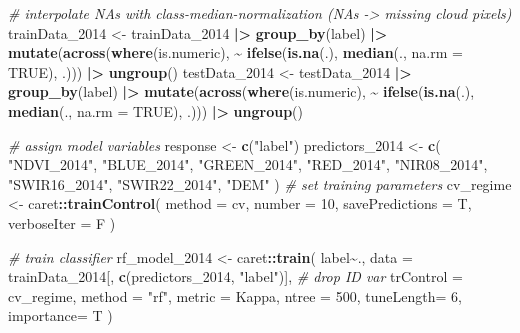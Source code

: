 \documentclass[
]{article}
\newenvironment{Shaded}{\begin{snugshade}}{\end{snugshade}}
\newcommand{\AttributeTok}[1]{\textcolor[rgb]{0.13,0.29,0.53}{#1}}
\newcommand{\CommentTok}[1]{\textcolor[rgb]{0.56,0.35,0.01}{\textit{#1}}}
\newcommand{\ConstantTok}[1]{\textcolor[rgb]{0.56,0.35,0.01}{#1}}
\newcommand{\DecValTok}[1]{\textcolor[rgb]{0.00,0.00,0.81}{#1}}
\newcommand{\FunctionTok}[1]{\textcolor[rgb]{0.13,0.29,0.53}{\textbf{#1}}}
\newcommand{\NormalTok}[1]{#1}
\newcommand{\OtherTok}[1]{\textcolor[rgb]{0.56,0.35,0.01}{#1}}
\newcommand{\SpecialCharTok}[1]{\textcolor[rgb]{0.81,0.36,0.00}{\textbf{#1}}}
\newcommand{\StringTok}[1]{\textcolor[rgb]{0.31,0.60,0.02}{#1}}
\begin{document}
\begin{Shaded}
\begin{Highlighting}[]
\CommentTok{\# interpolate NAs with class{-}median{-}normalization (NAs {-}\textgreater{} missing cloud pixels)}
\NormalTok{trainData\_2014 }\OtherTok{\textless{}{-}}\NormalTok{ trainData\_2014 }\SpecialCharTok{|\textgreater{}} \FunctionTok{group\_by}\NormalTok{(label) }\SpecialCharTok{|\textgreater{}} \FunctionTok{mutate}\NormalTok{(}\FunctionTok{across}\NormalTok{(}\FunctionTok{where}\NormalTok{(is.numeric),}
    \SpecialCharTok{\textasciitilde{}} \FunctionTok{ifelse}\NormalTok{(}\FunctionTok{is.na}\NormalTok{(.), }\FunctionTok{median}\NormalTok{(., }\AttributeTok{na.rm =} \ConstantTok{TRUE}\NormalTok{), .))) }\SpecialCharTok{|\textgreater{}} \FunctionTok{ungroup}\NormalTok{()}
\NormalTok{testData\_2014 }\OtherTok{\textless{}{-}}\NormalTok{ testData\_2014 }\SpecialCharTok{|\textgreater{}} \FunctionTok{group\_by}\NormalTok{(label) }\SpecialCharTok{|\textgreater{}} \FunctionTok{mutate}\NormalTok{(}\FunctionTok{across}\NormalTok{(}\FunctionTok{where}\NormalTok{(is.numeric),}
    \SpecialCharTok{\textasciitilde{}} \FunctionTok{ifelse}\NormalTok{(}\FunctionTok{is.na}\NormalTok{(.), }\FunctionTok{median}\NormalTok{(., }\AttributeTok{na.rm =} \ConstantTok{TRUE}\NormalTok{), .))) }\SpecialCharTok{|\textgreater{}} \FunctionTok{ungroup}\NormalTok{()}

\CommentTok{\# assign model variables}
\NormalTok{response  }\OtherTok{\textless{}{-}} \FunctionTok{c}\NormalTok{(}\StringTok{"label"}\NormalTok{)}
\NormalTok{predictors\_2014 }\OtherTok{\textless{}{-}} \FunctionTok{c}\NormalTok{(}
  \StringTok{"NDVI\_2014"}\NormalTok{, }\StringTok{"BLUE\_2014"}\NormalTok{, }\StringTok{"GREEN\_2014"}\NormalTok{, }\StringTok{"RED\_2014"}\NormalTok{, }
  \StringTok{"NIR08\_2014"}\NormalTok{, }\StringTok{"SWIR16\_2014"}\NormalTok{, }\StringTok{"SWIR22\_2014"}\NormalTok{, }\StringTok{"DEM"}
\NormalTok{  )}
\CommentTok{\# set training parameters}
\NormalTok{cv\_regime }\OtherTok{\textless{}{-}}\NormalTok{ caret}\SpecialCharTok{::}\FunctionTok{trainControl}\NormalTok{(}
  \AttributeTok{method          =} \StringTok{\textquotesingle{}cv\textquotesingle{}}\NormalTok{,}
  \AttributeTok{number          =} \DecValTok{10}\NormalTok{,}
  \AttributeTok{savePredictions =}\NormalTok{ T,}
  \AttributeTok{verboseIter     =}\NormalTok{ F}
\NormalTok{  )}

\CommentTok{\# train classifier}
\NormalTok{rf\_model\_2014 }\OtherTok{\textless{}{-}}\NormalTok{ caret}\SpecialCharTok{::}\FunctionTok{train}\NormalTok{(}
\NormalTok{  label}\SpecialCharTok{\textasciitilde{}}\NormalTok{.,}
  \AttributeTok{data =}\NormalTok{ trainData\_2014[, }\FunctionTok{c}\NormalTok{(predictors\_2014, }\StringTok{"label"}\NormalTok{)], }\CommentTok{\# drop ID var}
  \AttributeTok{trControl =}\NormalTok{ cv\_regime,}
  \AttributeTok{method    =} \StringTok{"rf"}\NormalTok{, }
  \AttributeTok{metric    =} \StringTok{\textquotesingle{}Kappa\textquotesingle{}}\NormalTok{, }
  \AttributeTok{ntree     =} \DecValTok{500}\NormalTok{,}
  \AttributeTok{tuneLength=} \DecValTok{6}\NormalTok{,}
  \AttributeTok{importance=}\NormalTok{ T}
\NormalTok{  )}
\end{Highlighting}
\end{Shaded}
\end{document}
